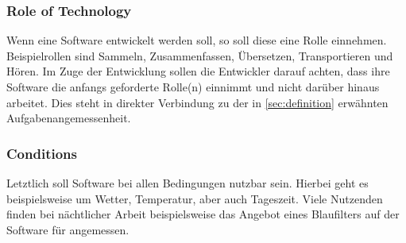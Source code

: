 \subsubsection{Role of Technology}

Wenn eine Software entwickelt werden soll, so soll diese eine Rolle einnehmen.
Beispielrollen sind Sammeln, Zusammenfassen, Übersetzen, Transportieren und Hören.
Im Zuge der Entwicklung sollen die Entwickler darauf achten, dass ihre Software die anfangs geforderte Rolle(n) einnimmt und nicht darüber hinaus arbeitet.
Dies steht in direkter Verbindung zu der in \autoref{sec:definition} erwähnten Aufgabenangemessenheit.

\subsubsection{Conditions}

Letztlich soll Software bei allen Bedingungen nutzbar sein.
Hierbei geht es beispielsweise um Wetter, Temperatur, aber auch Tageszeit.
Viele Nutzenden finden bei nächtlicher Arbeit beispielsweise das Angebot eines Blaufilters auf der Software für angemessen.

